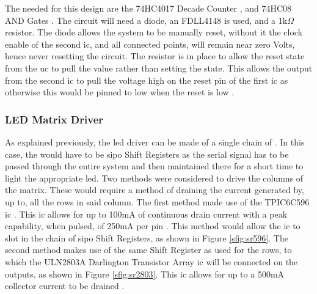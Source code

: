 \documentclass[12pt,a4paper]{report}
\begin{document}
The  needed for this design \cite{chainingCountersSelf} are the 74HC4017 Decade Counter \cite{4017}, and 74HC08 AND Gates \cite{7408}. The circuit will need a diode, an FDLL4148 \cite{Diode} is used, and a 1k$\Omega$ resistor. The diode allows the system to be manually reset, without it the clock enable of the second \ac{ic}, and all connected points, will remain near zero Volts, hence never resetting the circuit. The resistor is in place to allow the reset state from the \ac{uc} to pull the value rather than setting the state. This allows the output from the second \ac{ic} to pull the voltage high on the reset pin of the first \ac{ic} as otherwise this would be pinned to low when the reset is low \cite{chainingCountersSelf}.
\subsubsection{LED Matrix Driver} \label{sec:LEDDrvr}
As explained previously, the \ac{led} driver can be made of a single chain of . In this case, the  would have to be \ac{sipo} Shift Registers as the serial signal has to be passed through the entire system and then maintained there for a short time to light the appropriate \ac{led}. Two methods were considered to drive the columns of the matrix. These would require a method of draining the current generated by, up to, all the rows in said column. The first method made use of the TPIC6C596 \ac{ic} \cite{tpic}. This \ac{ic} allows for up to 100mA of continuous drain current with a peak capability, when pulsed, of 250mA per pin \cite{tpic}. This method would allow the \ac{ic} to slot in the chain of \ac{sipo} Shift Registers, as shown in Figure \ref{sfig:sr596}. The second method makes use of the same Shift Register as used for the rows, to which the ULN2803A Darlington Transistor Array \ac{ic} \cite{uln2803} will be connected on the outputs, as shown in Figure \ref{sfig:sr2803}. This \ac{ic} allows for up to a 500mA collector current to be drained \cite{uln2803}.
\end{document}
